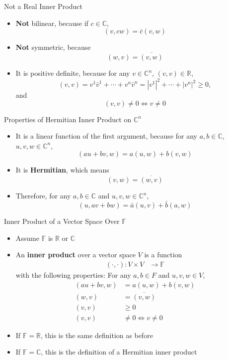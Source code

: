 \documentclass[usenames,dvipsnames,10pt]{beamer}
\newcommand\C{\mathbb{C}}
\newcommand\F{\mathbb{F}}
\newcommand{\R}{\mathbb{R}}
\begin{document}
\begin{frame}
  {Not a Real Inner Product}
  \begin{itemize}
  \item {\bf Not} bilinear, because if $c \in \C$,
    \[
      (v,cw) = \bar{c}(v,w)
    \]
  \item {\bf Not} symmetric, because
    \[
      (w,v) = \overline{(v,w)}
    \]
  \item It is positive definite, because for any $v \in \C^n$, $(v,v) \in \R$,
    \[
      (v,v) = v^1\bar{v}^1 + \cdots + v^n\bar{v}^n = |v^1|^2 + \cdots + |v^n|^2 \ge 0,
    \]
    and
    \[
      (v,v) \ne 0 \iff v \ne 0
    \]
  \end{itemize}
\end{frame}

\begin{frame}
  {Properties of Hermitian Inner Product on $\C^n$}

  \begin{itemize}
  \item It is a linear function of the first argument, because for any $a, b \in \C$, $u,v,w\in \C^n$,
    \[
      (au+bv,w) = a(u,w) + b(v,w)
    \]
  \item It is {\bf Hermitian}, which means
    \[ (v,w) = \overline{(w,v)} \]
  \item Therefore, for any $a,b \in \C$ and $u,v,w\in \C^n$,
    \[ (u,av+bw) = \bar{a}(u,v) + \bar{b}(a,w) \]
  \end{itemize}
\end{frame}

\begin{frame}
  {Inner Product of a Vector Space Over $\F$}

  \begin{itemize}
  \item Assume $\F$ is $\R$ or $\C$
  \item An {\bf inner product} over a vector space $V$ is a function
    \begin{align*}
      (\cdot,\cdot): V\times V &\rightarrow \F
    \end{align*}
    with the following properties: For any $a,b \in F$ and $u,v,w\in V$,
    \begin{align*}
      (au+bv,w) &= a(u,w)+b(v,w)\\
      (w,v) &= \overline{(v,w)}\\
      (v,v) &\ge 0\\
      (v,v) &\ne 0 \iff v\ne 0
    \end{align*}
  \item If $\F = \R$, this is the same definition as before
  \item If $\F = \C$, this is the definition of a Hermitian inner product
  \end{itemize}
\end{frame}
\end{document}
